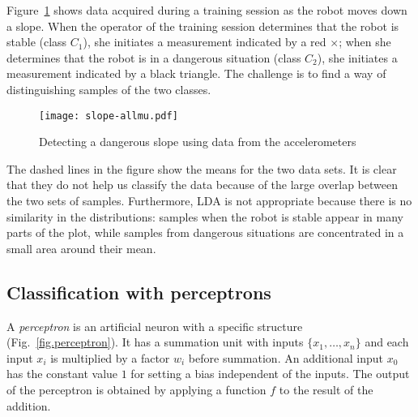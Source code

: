 Figure~\ref{fig.slopemes} shows data acquired during a training session as the robot moves down a slope. When the operator of the training session determines that the robot is stable (class $C_1$), she initiates a measurement indicated by a red $\times$; when she determines that the robot is in a dangerous situation (class $C_2$), she initiates a measurement indicated by a black triangle. The challenge is to find a way of distinguishing samples of the two classes.

\begin{figure}
\begin{center}
\texttt{[image: slope-allmu.pdf]}
\end{center}
\caption{Detecting a dangerous slope using data from the accelerometers}\label{fig.slopemes}
\end{figure}

The dashed lines in the figure show the means for the two data sets. It is clear that they do not help us classify the data because of the large overlap between the two sets of samples. Furthermore, LDA is not appropriate because there is no similarity in the distributions: samples when the robot is stable appear in many parts of the plot, while samples from dangerous situations are concentrated in a small area around their mean.

\subsection{Classification with perceptrons}

A \emph{perceptron} is an artificial neuron with a specific structure (Fig.~\ref{fig.perceptron}). It has a summation unit with inputs $\{x_1,\ldots,x_n\}$ and each input $x_i$ is multiplied by a factor $w_i$ before summation. An additional input $x_0$ has the constant value $1$ for setting a bias independent of the inputs. The output of the perceptron is obtained by applying a function $f$ to the result of the addition.

